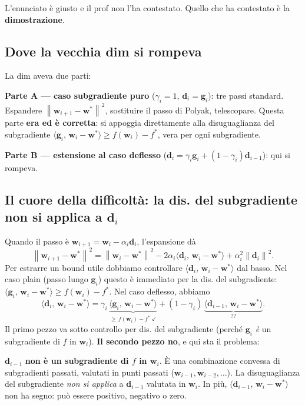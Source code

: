 \documentclass[11pt,a4paper]{article}
\newcommand{\norm}[1]{\left\|#1\right\|}
\newcommand{\inner}[2]{\langle #1,\,#2\rangle}
\newcommand{\bw}{\mathbf{w}}
\newcommand{\bg}{\mathbf{g}}
\newcommand{\bd}{\mathbf{d}}
\theoremstyle{definition}
\begin{document}
L'enunciato è giusto e il prof non l'ha contestato. Quello che ha contestato è la \textbf{dimostrazione}.

\subsection{Dove la vecchia dim si rompeva}

La dim aveva due parti:

\textbf{Parte A — caso subgradiente puro} ($\gamma_i=1$, $\bd_i = \bg_i$): tre passi standard. Espandere $\norm{\bw_{i+1}-\bw^*}^2$, sostituire il passo di Polyak, telescopare. Questa parte \textbf{era ed è corretta}: si appoggia direttamente alla disuguaglianza del subgradiente $\inner{\bg_i}{\bw_i-\bw^*} \ge f(\bw_i) - f^*$, vera per ogni subgradiente.

\textbf{Parte B — estensione al caso deflesso} ($\bd_i = \gamma_i\bg_i + (1-\gamma_i)\bd_{i-1}$): qui si rompeva.

\subsection{Il cuore della difficoltà: la dis. del subgradiente non si applica a $\bd_i$}

Quando il passo è $\bw_{i+1} = \bw_i - \alpha_i\bd_i$, l'espansione dà
\[
\norm{\bw_{i+1}-\bw^*}^2 = \norm{\bw_i-\bw^*}^2 - 2\alpha_i \inner{\bd_i}{\bw_i-\bw^*} + \alpha_i^2\norm{\bd_i}^2.
\]
Per estrarre un bound utile dobbiamo controllare $\inner{\bd_i}{\bw_i-\bw^*}$ dal basso. Nel caso plain (passo lungo $\bg_i$) questo è immediato per la dis. del subgradiente: $\inner{\bg_i}{\bw_i-\bw^*} \ge f(\bw_i)-f^*$. Nel caso deflesso, abbiamo
\[
\inner{\bd_i}{\bw_i-\bw^*} = \gamma_i\,\underbrace{\inner{\bg_i}{\bw_i-\bw^*}}_{\ge\,f(\bw_i)-f^*\;\checkmark} + (1-\gamma_i)\,\underbrace{\inner{\bd_{i-1}}{\bw_i-\bw^*}}_{??}.
\]
Il primo pezzo va sotto controllo per dis. del subgradiente (perché $\bg_i$ \emph{è} un subgradiente di $f$ in $\bw_i$). \textbf{Il secondo pezzo no}, e qui sta il problema:

\begin{tcolorbox}[warning]
$\bd_{i-1}$ \textbf{non è un subgradiente di $f$ in $\bw_i$}. È una combinazione convessa di subgradienti passati, valutati in punti passati ($\bw_{i-1}, \bw_{i-2},\dots$). La disuguaglianza del subgradiente \emph{non si applica} a $\bd_{i-1}$ valutata in $\bw_i$. In più, $\inner{\bd_{i-1}}{\bw_i-\bw^*}$ non ha segno: può essere positivo, negativo o zero.
\end{tcolorbox}
\end{document}
